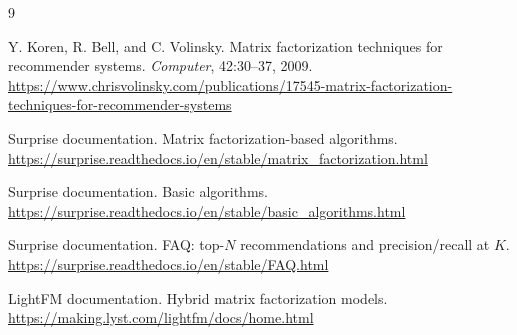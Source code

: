\documentclass[10pt,a4paper]{article}
\begin{document}
\begin{thebibliography}{9}

Y. Koren, R. Bell, and C. Volinsky.
\newblock Matrix factorization techniques for recommender systems.
\newblock \emph{Computer}, 42:30--37, 2009.
\newblock \url{https://www.chrisvolinsky.com/publications/17545-matrix-factorization-techniques-for-recommender-systems}

Surprise documentation.
\newblock Matrix factorization-based algorithms.
\newblock \url{https://surprise.readthedocs.io/en/stable/matrix_factorization.html}

Surprise documentation.
\newblock Basic algorithms.
\newblock \url{https://surprise.readthedocs.io/en/stable/basic_algorithms.html}

Surprise documentation.
\newblock FAQ: top-$N$ recommendations and precision/recall at $K$.
\newblock \url{https://surprise.readthedocs.io/en/stable/FAQ.html}

LightFM documentation.
\newblock Hybrid matrix factorization models.
\newblock \url{https://making.lyst.com/lightfm/docs/home.html}

\end{thebibliography}
\end{document}
